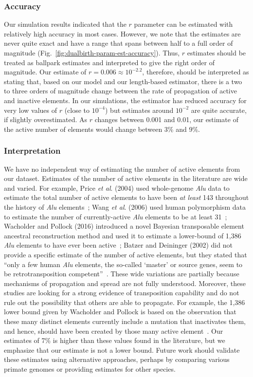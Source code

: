 \subsubsection{Accuracy}
Our simulation results indicated that the $r$ parameter can be estimated with relatively high accuracy in most cases. However, we note that the estimates are never quite exact and have a range that spans between half to a full order of magnitude (Fig.~\ref{fig:dualbirth-param-est-accuracy}). Thus, $r$ estimates should be treated as ballpark estimates and interpreted to give the right order of magnitude. Our estimate of $r=0.006\approx10^{-2.2}$, therefore, should be interpreted as stating that, based on our model and our length-based estimator, there is a two to three orders of magnitude change between the rate of propagation of active and inactive elements. In our simulations, the estimator has reduced accuracy for very low values of $r$ (close to $10^{-4}$) but estimates around $10^{-2}$ are quite accurate, if slightly overestimated. As $r$ changes between 0.001 and 0.01, our estimate of the active number of elements would change between 3\% and 9\%.

\subsubsection{Interpretation}
We have no independent way of estimating the number of active elements from our dataset. Estimates of the number of active elements in the literature are wide and varied. For example, Price \textit{et al}. (2004) used whole-genome \textit{Alu} data to estimate the total number of active elements to have been \textit{at least} 143 throughout the history of \textit{Alu} elements~\cite{Price2004}; Wang \textit{et al}. (2006) used human polymorphism data to estimate the number of currently-active \textit{Alu} elements to be at least 31~\cite{Wang2006}; Wacholder and Pollock (2016) introduced a novel Bayesian transposable element ancestral reconstruction method and used it to estimate a lower-bound of 1,386 \textit{Alu} elements to have ever been active~\cite{Wacholder2016}; Batzer and Deininger (2002) did not provide a specific estimate of the number of active elements, but they stated that ``only a few human \textit{Alu} elements, the so-called `master' or source genes, seem to be retrotransposition competent''~\cite{Batzer2002}. These wide variations are partially because mechanisms of propagation and spread are not fully understood. Moreover, these studies are looking for a strong evidence of transposition capability and do not rule out the possibility that others are able to propagate. For example,  the 1,386 lower bound given by Wacholder and Pollock is based on the observation that these many distinct elements currently include a mutation that inactivates them, and hence, should have been created by those many active element~\cite{Wacholder2016}. Our estimates of 7\% is higher than these values found in the literature, but we emphasize that our estimate is not a lower bound. Future work should validate these estimates using alternative approaches, perhaps by comparing various primate genomes or providing estimates for other species.

